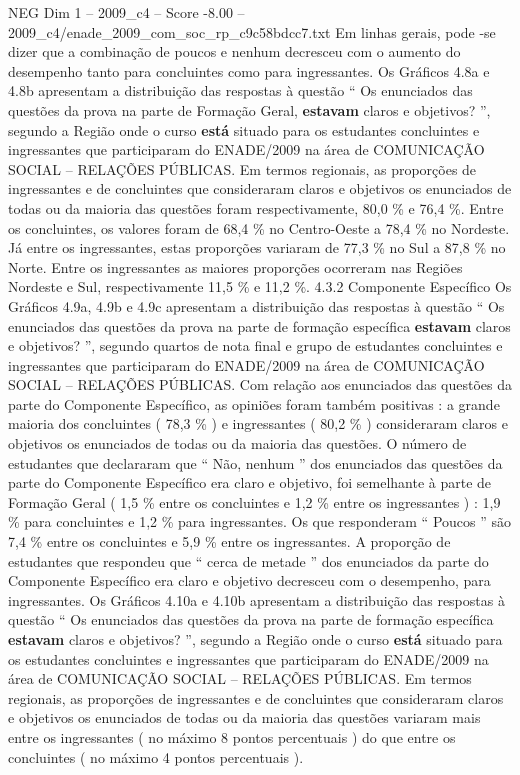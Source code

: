 \begin{textsample}{NEG Dim 1 – 2009\_c4 – Score -8.00 – 2009\_c4/enade\_2009\_com\_soc\_rp\_c9c58bdcc7.txt}
Em linhas gerais, pode -se dizer que a combinação de poucos e nenhum decresceu com o aumento do desempenho tanto para concluintes como para ingressantes.
Os Gráficos 4.8a e 4.8b apresentam a distribuição das respostas à questão “ Os enunciados das questões da prova na parte de Formação Geral, \textbf{estavam} claros e objetivos? ”, segundo a Região onde o curso \textbf{está} situado para os estudantes concluintes e ingressantes que participaram do ENADE/2009 na área de COMUNICAÇÃO SOCIAL – RELAÇÕES PÚBLICAS.
Em termos regionais, as proporções de ingressantes e de concluintes que consideraram claros e objetivos os enunciados de todas ou da maioria das questões foram respectivamente, 80,0 \% e 76,4 \%.
Entre os concluintes, os valores foram de 68,4 \% no Centro-Oeste a 78,4 \% no Nordeste.
Já entre os ingressantes, estas proporções variaram de 77,3 \% no Sul a 87,8 \% no Norte.
Entre os ingressantes as maiores proporções ocorreram nas Regiões Nordeste e Sul, respectivamente 11,5 \% e 11,2 \%. 4.3.2 Componente Específico Os Gráficos 4.9a, 4.9b e 4.9c apresentam a distribuição das respostas à questão “ Os enunciados das questões da prova na parte de formação específica \textbf{estavam} claros e objetivos? ”, segundo quartos de nota final e grupo de estudantes concluintes e ingressantes que participaram do ENADE/2009 na área de COMUNICAÇÃO SOCIAL – RELAÇÕES PÚBLICAS.
Com relação aos enunciados das questões da parte do Componente Específico, as opiniões foram também positivas : a grande maioria dos concluintes ( 78,3 \% ) e ingressantes ( 80,2 \% ) consideraram claros e objetivos os enunciados de todas ou da maioria das questões.
O número de estudantes que declararam que “ Não, nenhum ” dos enunciados das questões da parte do Componente Específico era claro e objetivo, foi semelhante à parte de Formação Geral ( 1,5 \% entre os concluintes e 1,2 \% entre os ingressantes ) : 1,9 \% para concluintes e 1,2 \% para ingressantes.
Os que responderam “ Poucos ” são 7,4 \% entre os concluintes e 5,9 \% entre os ingressantes.
A proporção de estudantes que respondeu que “ cerca de metade ” dos enunciados da parte do Componente Específico era claro e objetivo decresceu com o desempenho, para ingressantes.
Os Gráficos 4.10a e 4.10b apresentam a distribuição das respostas à questão “ Os enunciados das questões da prova na parte de formação específica \textbf{estavam} claros e objetivos? ”, segundo a Região onde o curso \textbf{está} situado para os estudantes concluintes e ingressantes que participaram do ENADE/2009 na área de COMUNICAÇÃO SOCIAL – RELAÇÕES PÚBLICAS.
Em termos regionais, as proporções de ingressantes e de concluintes que consideraram claros e objetivos os enunciados de todas ou da maioria das questões variaram mais entre os ingressantes ( no máximo 8 pontos percentuais ) do que entre os concluintes ( no máximo 4 pontos percentuais ).

\end{textsample}
